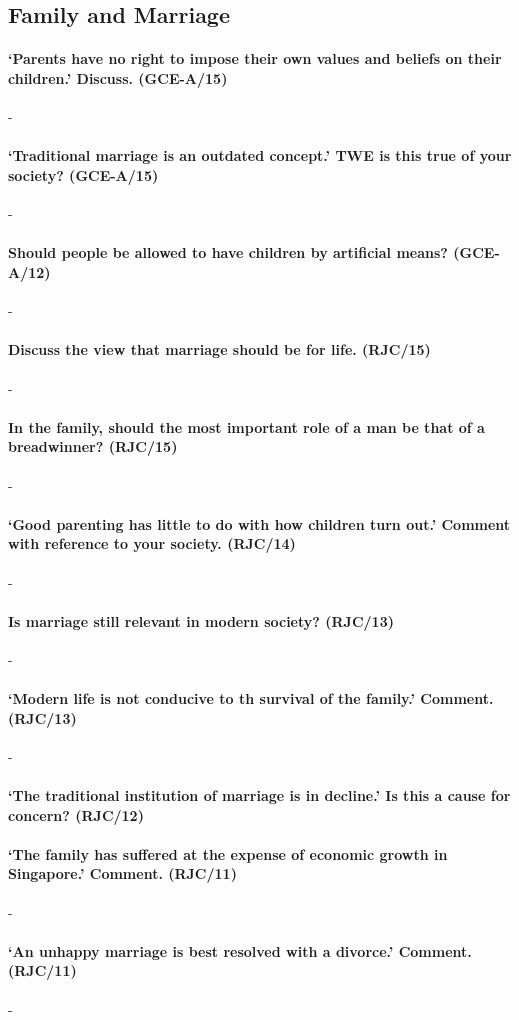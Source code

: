 \documentclass[../../main]{subfiles}
\begin{document}
\subsection{Family and Marriage}

\paragraph{`Parents have no right to impose their own values and beliefs on their children.' Discuss. (GCE-A/15)}-

\paragraph{`Traditional marriage is an outdated concept.' TWE is this true of your society? (GCE-A/15)}-

\paragraph{Should people be allowed to have children by artificial means? (GCE-A/12)}-

\paragraph{Discuss the view that marriage should be for life. (RJC/15)}-

\paragraph{In the family, should the most important role of a man be that of a breadwinner? (RJC/15)}-

\paragraph{`Good parenting has little to do with how children turn out.' Comment with reference to your society. (RJC/14)}-

\paragraph{Is marriage still relevant in modern society? (RJC/13)}-

\paragraph{`Modern life is not conducive to th survival of the family.' Comment. (RJC/13)}-

\paragraph{`The traditional institution of marriage is in decline.' Is this a cause for concern? (RJC/12)}

\paragraph{`The family has suffered at the expense of economic growth in Singapore.' Comment. (RJC/11)}-

\paragraph{`An unhappy marriage is best resolved with a divorce.' Comment. (RJC/11)}-
\end{document}

